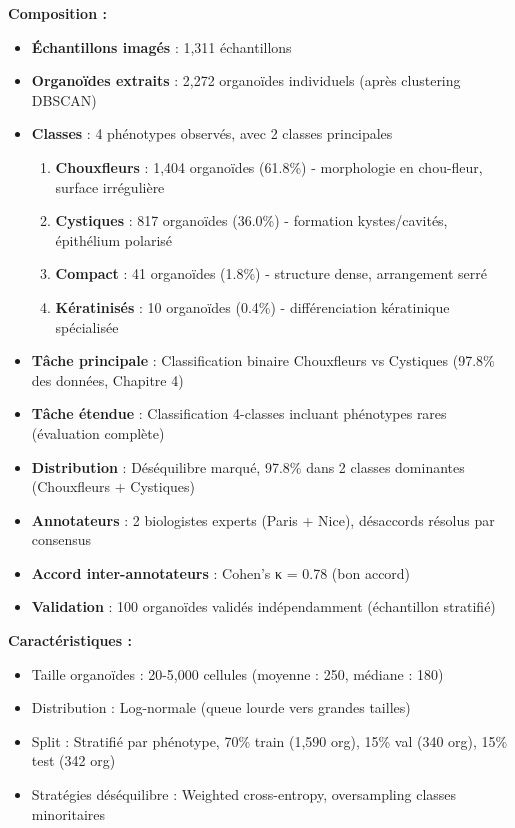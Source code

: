 \textbf{Composition :}
\begin{itemize}
    \item \textbf{Échantillons imagés} : 1,311 échantillons
    \item \textbf{Organoïdes extraits} : 2,272 organoïdes individuels (après clustering DBSCAN)
    \item \textbf{Classes} : 4 phénotypes observés, avec 2 classes principales
    \begin{enumerate}
        \item \textbf{Chouxfleurs} : 1,404 organoïdes (61.8\%) - morphologie en chou-fleur, surface irrégulière
        \item \textbf{Cystiques} : 817 organoïdes (36.0\%) - formation kystes/cavités, épithélium polarisé
        \item \textbf{Compact} : 41 organoïdes (1.8\%) - structure dense, arrangement serré
        \item \textbf{Kératinisés} : 10 organoïdes (0.4\%) - différenciation kératinique spécialisée
    \end{enumerate}
    \item \textbf{Tâche principale} : Classification binaire Chouxfleurs vs Cystiques (97.8\% des données, Chapitre 4)
    \item \textbf{Tâche étendue} : Classification 4-classes incluant phénotypes rares (évaluation complète)
    \item \textbf{Distribution} : Déséquilibre marqué, 97.8\% dans 2 classes dominantes (Chouxfleurs + Cystiques)
    \item \textbf{Annotateurs} : 2 biologistes experts (Paris + Nice), désaccords résolus par consensus
    \item \textbf{Accord inter-annotateurs} : Cohen's κ = 0.78 (bon accord)
    \item \textbf{Validation} : 100 organoïdes validés indépendamment (échantillon stratifié)
\end{itemize}

\textbf{Caractéristiques :}
\begin{itemize}
    \item Taille organoïdes : 20-5,000 cellules (moyenne : 250, médiane : 180)
    \item Distribution : Log-normale (queue lourde vers grandes tailles)
    \item Split : Stratifié par phénotype, 70\% train (1,590 org), 15\% val (340 org), 15\% test (342 org)
    \item Stratégies déséquilibre : Weighted cross-entropy, oversampling classes minoritaires
\end{itemize}

